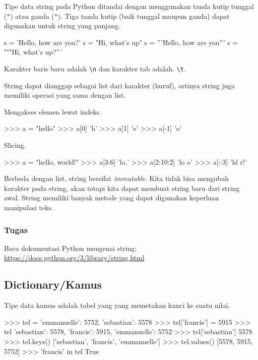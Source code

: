\documentclass[a4paper,11pt]{extarticle}
\begin{document}
Tipe data string pada Python ditandai dengan menggunakan tanda
kutip tunggal (\texttt{"}) atau ganda (\texttt{"}). Tiga tanda kutip
(baik tunggal maupun ganda) dapat digunakan untuk string yang panjang.
\begin{pyconcode}
s = 'Hello, how are you?'
s = "Hi, what's up"
s = '''Hello, 
       how are you'''
s = """Hi,
   what's up?'''
\end{pyconcode}

Karakter baris baru adalah \verb|\n| dan karakter tab adalah.
\verb|\t|.

String dapat dianggap sebagai list dari karakter (huruf), artinya string
juga memiliki operasi yang sama dengan list.

Mengakses elemen lewat indeks.
\begin{pyconcode}
>>> a = "hello"
>>> a[0]
'h'
>>> a[1]
'e'
>>> a[-1]
'o'
\end{pyconcode}

Slicing.
\begin{pyconcode}
>>> a = "hello, world!"
>>> a[3:6]
'lo,'
>>> a[2:10:2]
'lo o'
>>> a[::3]
'hl r!'
\end{pyconcode}

Berbeda dengan list, string bersifat \textit{immutable}.
Kita tidak bisa mengubah karakter pada string, akan tetapi kita dapat
membuat string baru dari string awal.
String memiliki banyak metode yang dapat digunakan keperluan
manipulasi teks.

\subsubsection*{Tugas}

Baca dokumentasi Python mengenai string:
\url{https://docs.python.org/3/library/string.html}



\subsection{Dictionary/Kamus}

Tipe data kamus adalah tabel yang yang memetakan kunci ke suatu nilai.
\begin{pyconcode}
>>> tel = {'emmanuelle': 5752, 'sebastian': 5578}
>>> tel['francis'] = 5915 
>>> tel
{'sebastian': 5578, 'francis': 5915, 'emmanuelle': 5752}
>>> tel['sebastian']
5578
>>> tel.keys()
['sebastian', 'francis', 'emmanuelle']
>>> tel.values()
[5578, 5915, 5752]
>>> 'francis' in tel
True
\end{pyconcode}
\end{document}
